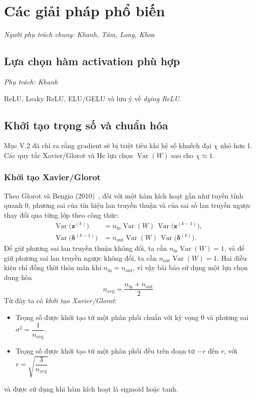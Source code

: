 \documentclass[12pt]{article}
\begin{document}
\section{Các giải pháp phổ biến}
\textit{Người phụ trách chung: Khanh, Tâm, Long, Khoa}

\subsection{Lựa chọn hàm activation phù hợp}
\textit{Phụ trách: Khanh}

ReLU, Leaky ReLU, ELU/GELU và lưu ý về \textit{dying ReLU}.

\subsection{Khởi tạo trọng số và chuẩn hóa}
\label{subsec:fix-weightinit-normalization}


Mục V.2 đã chỉ ra rằng gradient sẽ bị triệt tiêu khi hệ số khuếch đại $\chi$ nhỏ hơn 1. Các quy tắc Xavier/Glorot và He lựa chọn $\operatorname{Var}(W)$ sao cho $\chi \approx 1$.

\subsubsection{Khởi tạo Xavier/Glorot}
Theo Glorot và Bengio (2010)~\cite{glorot2010}, đối với một hàm kích hoạt gần như tuyến tính quanh $0$, phương sai của tín hiệu lan truyền thuận và của sai số lan truyền ngược thay đổi qua từng lớp theo công thức:
\begin{align*}
    \operatorname{Var}\big( \mathbf{z}^{(k)} \big)
& = n_{\text{in}} \operatorname{Var}(W)\, \operatorname{Var}\big( \mathbf{z}^{(k-1)} \big), \\
\operatorname{Var}\big( \boldsymbol\delta^{(k-1)} \big)&  = n_{\text{out}} \operatorname{Var}(W)\, \operatorname{Var}\big( \boldsymbol \delta^{(k)} \big).
\end{align*}
Để giữ phương sai lan truyền thuận không đổi, ta cần $n_{\text{in}} \operatorname{Var}(W) = 1$, và để giữ phương sai lan truyền ngược không đổi, ta cần $n_{\text{out}} \operatorname{Var}(W) = 1$. Hai điều kiện chỉ đồng thời thỏa mãn khi $n_{\text{in}} =n_{\text{out}}$, vì vậy bài báo sử dụng một lựa chọn dung hòa
\[ n_{\text{avg}} = \frac{n_{\text{in}} + n_{\text{out}}}{2}\]
Từ đây ta có \textit{khởi tạo Xavier/Glorot}:
\begin{itemize}
    \item Trọng số được khởi tạo từ một phân phối chuẩn với kỳ vọng 0 và phương sai $\sigma^2 = \dfrac{1}{n_{\text{avg}}}$.

    \item Trọng số được khởi tạo từ một phân phối đều trên đoạn từ $-r$ đến $r$, với $r = \sqrt{\dfrac{3}{n_{\text{avg}}}}$
\end{itemize}
và được sử dụng khi hàm kích hoạt là sigmoid hoặc tanh.
\end{document}
